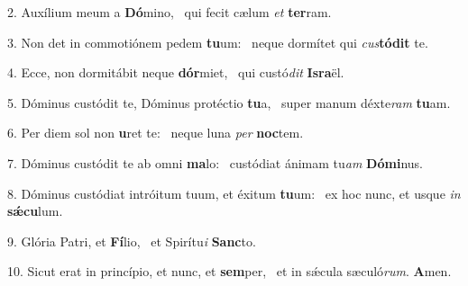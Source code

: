 2. Auxílium meum a \textbf{Dó}mino, \ast\  qui fecit cælum \textit{et} \textbf{ter}ram.\

3. Non det in commotiónem pedem \textbf{tu}um: \ast\  neque dormítet qui \textit{cus}\textbf{tó}\textbf{dit} te.\

4. Ecce, non dormitábit neque \textbf{dór}miet, \ast\  qui custó\textit{dit} \textbf{Is}\textbf{ra}ël.\

5. Dóminus custódit te, Dóminus protéctio \textbf{tu}a, \ast\  super manum déxte\textit{ram} \textbf{tu}am.\

6. Per diem sol non \textbf{u}ret te: \ast\  neque luna \textit{per} \textbf{noc}tem.\

7. Dóminus custódit te ab omni \textbf{ma}lo: \ast\  custódiat ánimam tu\textit{am} \textbf{Dó}\textbf{mi}nus.\

8. Dóminus custódiat intróitum tuum, et éxitum \textbf{tu}um: \ast\  ex hoc nunc, et usque \textit{in} \textbf{sǽ}\textbf{cu}lum.\

9. Glória Patri, et \textbf{Fí}lio, \ast\  et Spirítu\textit{i} \textbf{Sanc}to.\

10. Sicut erat in princípio, et nunc, et \textbf{sem}per, \ast\  et in sǽcula sæculó\textit{rum}. \textbf{A}men.\

